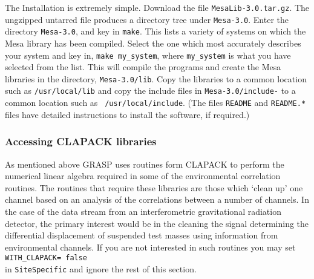 The Installation is extremely simple. Download the file 
{\tt MesaLib-3.0.tar.gz}. The ungzipped untarred 
file produces a directory tree under {\tt Mesa-3.0}. Enter the 
directory {\tt Mesa-3.0}, and key in {\tt make}. This lists a variety
of systems on which the Mesa library has been compiled. Select the one
which most accurately describes your system and key in, 
{\tt make my\_system},
where {\tt my\_system} is what you have selected from the list. 
This will compile the programs and create the Mesa libraries in the
directory, {\tt Mesa-3.0/lib}. Copy the libraries to a common location
such as {\tt /usr/local/lib} and copy the include files in
{\tt Mesa-3.0/include-} to  a common location such as {\tt
/usr/local/include}. (The files {\tt README} and {\tt README.*} files
have detailed instructions to install the software, if required.)

\subsubsection{Accessing CLAPACK libraries}
As mentioned above GRASP uses routines form CLAPACK to perform 
the numerical linear algebra required in some of the environmental
correlation routines. The routines that require these libraries are
those which `clean up' one channel based on an analysis of the
correlations between a number of channels.
 In the case of the data stream from an
interferometric gravitational radiation detector, the primary interest 
would be in the cleaning the signal determining the differential
displacement  of suspended test masses using information from
environmental channels.  If you are not interested in such routines
you may set\\ {\tt WITH\_CLAPACK= false}\\ in {\tt SiteSpecific} and
ignore the rest of this section.

